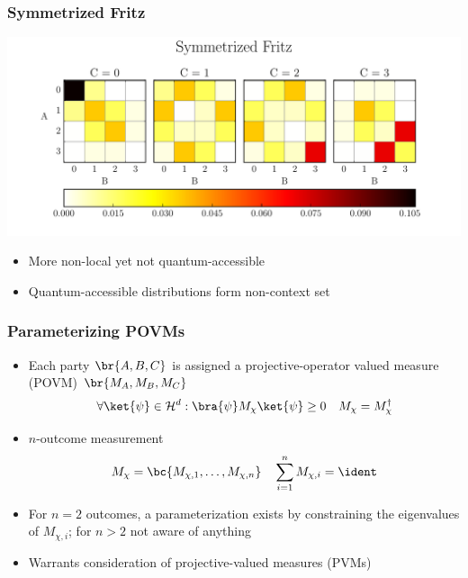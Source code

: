 \documentclass[
    hyperref={bookmarks=false},%
    xcolor={dvipsnames},
]{beamer}
\renewcommand{\term}[1]{\textcolor{Mahogany}{#1}}
\begin{document}
\begin{frame}
    \frametitle{Symmetrized Fritz}
    \begin{center}
        \includegraphics[width=\linewidth]{../../figures/distributions/symmetrized_fritz.pdf}
    \end{center}
    \begin{itemize}
        \item More non-local yet not quantum-accessible
        \item Quantum-accessible distributions form non-context set
    \end{itemize}
\end{frame}

\begin{frame}
    \frametitle{Parameterizing POVMs}
    \begin{itemize}
        \item Each party $\br{A, B, C}$ is assigned a \term{projective-operator valued measure (POVM)} $\br{M_A, M_B, M_C}$
        \[ \forall \ket{\psi} \in \Hilb^d : \bra{\psi} M_\chi \ket{\psi} \geq 0 \quad M_\chi = M_\chi^{\dagger} \]
        \item $n$-outcome measurement
        \[ M_\chi = \bc{M_{\chi, 1}, \ldots, M_{\chi, n}} \quad \sum_{i=1}^{n} M_{\chi, i} = \ident \]
        \item For $n = 2$ outcomes, a parameterization exists by constraining the eigenvalues of $M_{\chi, i}$; for $n > 2$ not aware of anything
        \item Warrants consideration of \term{projective-valued measures (PVMs)}
    \end{itemize}
\end{frame}
\end{document}
